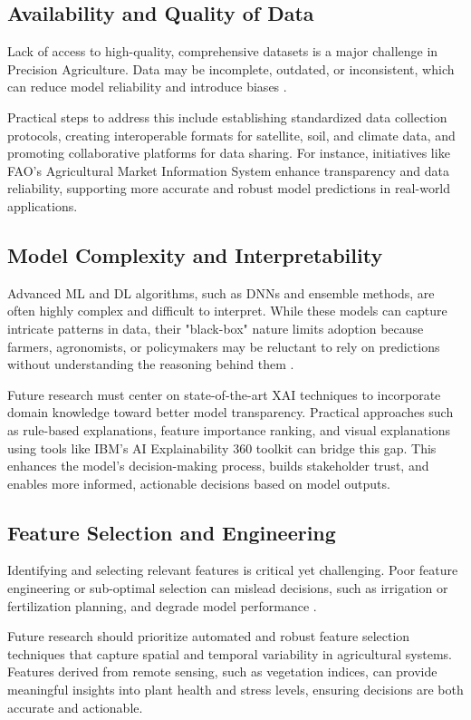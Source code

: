 \documentclass[conference]{IEEEtran}
\begin{document}
\subsection{Availability and Quality of Data}\label{AA}
Lack of access to high-quality, comprehensive datasets is a major challenge in Precision Agriculture. Data may be incomplete, outdated, or inconsistent, which can reduce model reliability and introduce biases \cite{b83}.

Practical steps to address this include establishing standardized data collection protocols, creating interoperable formats for satellite, soil, and climate data, and promoting collaborative platforms for data sharing. For instance, initiatives like FAO's Agricultural Market Information System enhance transparency and data reliability, supporting more accurate and robust model predictions in real-world applications.

\subsection{Model Complexity and Interpretability}\label{AA}
Advanced ML and DL algorithms, such as DNNs and ensemble methods, are often highly complex and difficult to interpret. While these models can capture intricate patterns in data, their "black-box" nature limits adoption because farmers, agronomists, or policymakers may be reluctant to rely on predictions without understanding the reasoning behind them \cite{b84}.

Future research must center on state-of-the-art XAI techniques to incorporate domain knowledge toward better model transparency. Practical approaches such as rule-based explanations, feature importance ranking, and visual explanations using tools like IBM's AI Explainability 360 toolkit can bridge this gap. This enhances the model’s decision-making process, builds stakeholder trust, and enables more informed, actionable decisions based on model outputs.

\subsection{Feature Selection and Engineering}\label{AA}
Identifying and selecting relevant features is critical yet challenging. Poor feature engineering or sub-optimal selection can mislead decisions, such as irrigation or fertilization planning, and degrade model performance \cite{b85}.

Future research should prioritize automated and robust feature selection techniques that capture spatial and temporal variability in agricultural systems. Features derived from remote sensing, such as vegetation indices, can provide meaningful insights into plant health and stress levels, ensuring decisions are both accurate and actionable.
\end{document}

